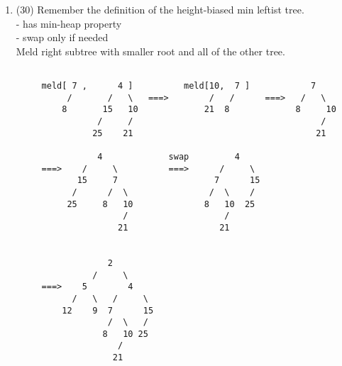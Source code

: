 \begin{enumerate}
\begin{enumerate}
\begin{verbatim}
                (3,59)                      
    ===>     /          \                    
       (37,40)          (7,51)             
        /    \          /                                    
    (11,30)  (15,29) (8,42)        



                (3,59)                      
    ===>     /          \                    
       (11,40)          (7,51)             
        /    \          /                                    
    (37,30)  (15,29) (8,42)     



    swap        (3,59)                      
    ===>     /          \                    
       (11,40)          (7,51)             
        /    \          /                                    
    (30,37)  (15,29) (8,42)     
   \end{verbatim}
 \end{enumerate}

\item (30) 
  Remember the definition of the height-biased min leftist tree. \\
    - has min-heap property\\
    - swap only if needed\\
  Meld right subtree with smaller root and all of the other tree.
   \begin{verbatim}

     meld[ 7 ,      4 ]          meld[10,  7 ]            7
          /       /   \   ===>        /   /      ===>   /   \
         8       15   10             21  8             8     10
                /     /                                     / 
               25    21                                    21 

                4             swap         4
     ===>    /     \          ===>      /     \
            15     7                   7      15
           /      /  \                /  \    / 
          25     8   10              8   10  25
                     /                   /
                    21                  21
 

                  2 
               /     \ 
     ===>    5        4 
           /   \   /     \
         12    9  7      15   
                  /  \   /    
                 8   10 25    
                    /           
                   21       
   \end{verbatim}



\end{enumerate}
